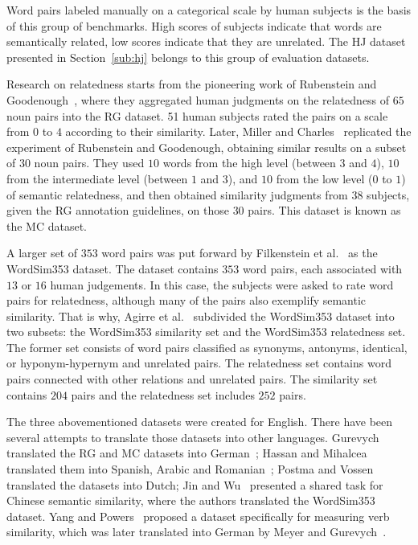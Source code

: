 \documentclass[runningheads,a4paper]{llncs}
\begin{document}
Word pairs labeled manually on a categorical scale by human subjects is the basis of this group of benchmarks. High scores of subjects indicate that words are semantically related, low scores indicate that they are unrelated. The HJ dataset presented in Section~\ref{sub:hj} belongs to this group of evaluation datasets.

Research on relatedness starts from the pioneering work of Rubenstein and Goodenough~\cite{Rubenstein:65}, where they aggregated human judgments on the relatedness of $65$ noun pairs into the RG dataset. 51 human subjects rated the pairs on a scale from $0$ to $4$ according to their similarity. Later, Miller and Charles~\cite{Miller:91} replicated the experiment of Rubenstein and Goodenough, obtaining similar results on a subset of $30$ noun pairs. They used $10$ words from the high level (between $3$ and $4$), $10$ from the intermediate level (between $1$ and $3$), and $10$ from the low level ($0$ to $1$) of semantic relatedness, and then obtained similarity judgments from $38$ subjects, given the RG annotation guidelines, on those $30$ pairs. This dataset is known as the MC dataset. 

A larger set of $353$ word pairs was put forward by Filkenstein et al.~\cite{Finkelstein:01} as the WordSim353 dataset. The dataset contains $353$ word pairs, each associated with $13$ or $16$ human judgements. In this case, the subjects were asked to rate word pairs for relatedness, although many of the pairs also exemplify semantic similarity. That is why, Agirre et al.~\cite{Agirre:09} subdivided the WordSim353 dataset into two subsets: the WordSim353 similarity  set and the WordSim353 relatedness set. The former set consists of word pairs classified as synonyms, antonyms, identical, or hyponym-hypernym and unrelated pairs. The relatedness set contains word pairs connected with other relations and unrelated pairs. The similarity set contains $204$ pairs and the relatedness set includes $252$ pairs.

The three abovementioned  datasets were created for English. There have been several attempts to translate those datasets into other languages. Gurevych translated the RG and MC datasets into German~\cite{Gurevych:05}; Hassan and Mihalcea translated them into Spanish, Arabic and Romanian~\cite{Hassan:09}; Postma and Vossen~\cite{Postma:14} translated the datasets into Dutch; Jin and Wu~\cite{Jin:12} presented a shared task for Chinese semantic similarity, where the authors translated the WordSim353 dataset. Yang and Powers~\cite{Yang:06} proposed a dataset specifically for measuring verb similarity, which was later translated into German by Meyer and Gurevych~\cite{Meyer:12}.
\end{document}
